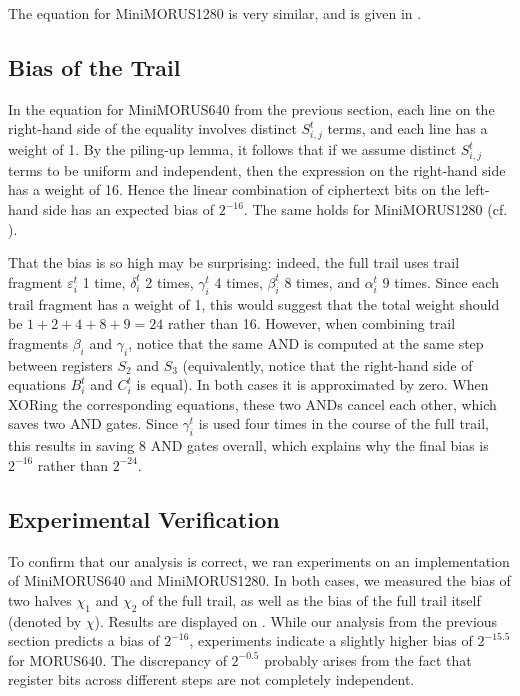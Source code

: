 \documentclass{llncs}
\newcommand{\cipher}[1]{\textsf{#1}}
\begin{document}
The equation for \cipher{MiniMORUS1280} is very similar, and is given in .

\subsection{Bias of the Trail}
\label{sec:minibias}

In the equation for \cipher{MiniMORUS640} from the previous section, each line on the right-hand side of the equality involves distinct $S^t_{i,j}$ terms, and each line has a weight of 1. By the piling-up lemma, it follows that if we assume distinct $S^t_{i,j}$ terms to be uniform and independent, then the expression on the right-hand side has a weight of 16. Hence the linear combination of ciphertext bits on the left-hand side has an expected bias of $2^{-16}$. The same holds for \cipher{MiniMORUS1280} (cf. ).

That the bias is so high may be surprising: indeed, the full trail uses trail fragment $\varepsilon^t_i$ 1 time, $\delta^t_i$ 2 times, $\gamma^t_i$ 4 times, $\beta^t_i$ 8 times, and $\alpha^t_i$ 9 times. Since each trail fragment has a weight of 1, this would suggest that the total weight should be $1+2+4+8+9 = 24$ rather than 16. However, when combining trail fragments $\beta_i$ and $\gamma_i$, notice that the same AND is computed at the same step between registers $S_2$ and $S_3$ (equivalently, notice that the right-hand side of equations $B^t_i$ and $C^t_i$ is equal). In both cases it is approximated by zero. When XORing the corresponding equations, these two ANDs cancel each other, which saves two AND gates. Since $\gamma^t_i$ is used four times in the course of the full trail, this results in saving 8 AND gates overall, which explains why the final bias is $2^{-16}$ rather than $2^{-24}$.

\subsection{Experimental Verification}

To confirm that our analysis is correct, we ran experiments on an implementation of \cipher{MiniMORUS640} and \cipher{MiniMORUS1280}. In both cases, we measured the bias of two halves $\chi_1$ and $\chi_2$ of the full trail, as well as the bias of the full trail itself (denoted by $\chi$). Results are displayed on . 
While our analysis from the previous section predicts a bias of $2^{-16}$, experiments indicate a slightly higher bias of $2^{-15.5}$ for \cipher{MORUS640}. The discrepancy of $2^{-0.5}$ probably arises from the fact that register bits across different steps are not completely independent.
\end{document}
